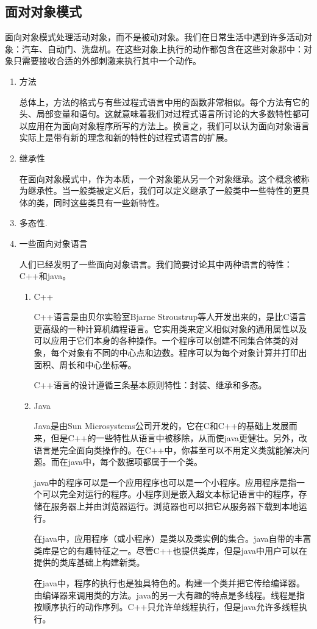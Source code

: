 \subsection{面对对象模式}
面向对象模式处理活动对象，而不是被动对象。我们在日常生活中遇到许多活动对象：汽车、自动门、洗盘机。在这些对象上执行的动作都包含在这些对象那中：对象只需要接收合适的外部刺激来执行其中一个动作。
\begin{enumerate}
	\item 方法

	总体上，方法的格式与有些过程式语言中用的函数非常相似。每个方法有它的头、局部变量和语句。这就意味着我们对过程式语言所讨论的大多数特性都可以应用在为面向对象程序所写的方法上。换言之，我们可以认为面向对象语言实际上是带有新的理念和新的特性的过程式语言的扩展。
	\item 继承性

	在面向对象模式中，作为本质，一个对象能从另一个对象继承。这个概念被称为继承性。当一般类被定义后，我们可以定义继承了一般类中一些特性的更具体的类，同时这些类具有一些新特性。

	\item 多态性.
	
	\item 一些面向对象语言

	人们已经发明了一些面向对象语言。我们简要讨论其中两种语言的特性：C++和java。
	\begin{enumerate}
		\item C++
	
		C++语言是由贝尔实验室Bjarne Stroustrup等人开发出来的，是比C语言更高级的一种计算机编程语言。它实用类来定义相似对象的通用属性以及可以应用于它们本身的各种操作。一个程序可以创建不同集合体类的对象，每个对象有不同的中心点和边数。程序可以为每个对象计算并打印出面积、周长和中心坐标等。

		C++语言的设计遵循三条基本原则特性：封装、继承和多态。
		\item Java

		Java是由Sun Microsystems公司开发的，它在C和C++的基础上发展而来，但是C++的一些特性从语言中被移除，从而使java更健壮。另外，改语言是完全面向类操作的。在C++中，你甚至可以不用定义类就能解决问题。而在java中，每个数据项都属于一个类。

		java中的程序可以是一个应用程序也可以是一个小程序。应用程序是指一个可以完全对运行的程序。小程序则是嵌入超文本标记语言中的程序，存储在服务器上并由浏览器运行。浏览器也可以把它从服务器下载到本地运行。

		在java中，应用程序（或小程序）是类以及类实例的集合。java自带的丰富类库是它的有趣特征之一。尽管C++也提供类库，但是java中用户可以在提供的类库基础上构建新类。

		在java中，程序的执行也是独具特色的。构建一个类并把它传给编译器。由编译器来调用类的方法。java的另一大有趣的特点是多线程。线程是指按顺序执行的动作序列。C++只允许单线程执行，但是java允许多线程执行。
	\end{enumerate}
\end{enumerate}
